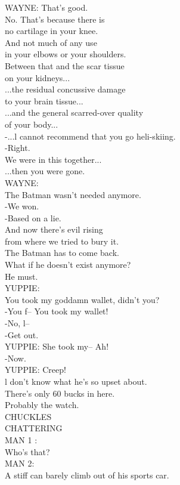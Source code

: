 \documentclass{article}
\begin{document}
\begin{multicols}{3}
WAYNE: That's good.\\
No. That's because there is\\
no cartilage in your knee.\\
And not much of any use\\
in your elbows or your shoulders.\\
Between that and the scar tissue\\
on your kidneys...\\
...the residual concussive damage\\
to your brain tissue...\\
...and the general scarred-over quality\\
of your body...\\
-...l cannot recommend that you go heli-skiing.\\
-Right.\\
We were in this together...\\
...then you were gone.\\
WAYNE:\\
The Batman wasn't needed anymore.\\
-We won.\\
-Based on a lie.\\
And now there's evil rising\\
from where we tried to bury it.\\
The Batman has to come back.\\
What if he doesn't exist anymore?\\
He must.\\
YUPPIE:\\
You took my goddamn wallet, didn't you?\\
-You f-- You took my wallet!\\
-No, l--\\
-Get out.\\
YUPPIE: She took my-- Ah!\\
-Now.\\
YUPPIE: Creep!\\
l don't know what he's so upset about.\\
There's only 60 bucks in here.\\
Probably the watch.\\
CHUCKLES\\
CHATTERING\\
MAN 1 :\\
Who's that?\\
MAN 2:\\
A stiff can barely climb out of his sports car.\\

\end{multicols}
\end{document}
